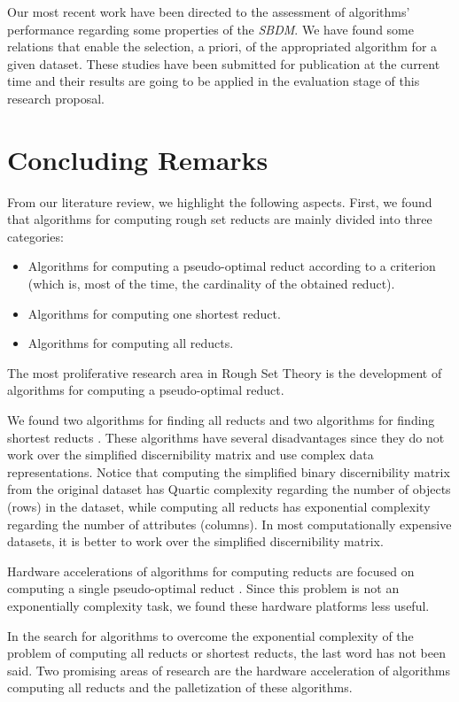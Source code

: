 \documentclass[citenumber]{elsarticle}
\begin{document}
	Our most recent work have been directed to the assessment of algorithms' performance regarding some properties of the \textit{SBDM}. We have found some relations that enable the selection, a priori, of the appropriated algorithm for a given dataset. These studies have been submitted for publication at the current time and their results are going to be applied in the evaluation stage of this research proposal. 
%
\section{Concluding Remarks}\label{conclusions}
%
   From our literature review, we highlight the following aspects. First, we found that algorithms for computing rough set reducts are mainly divided into three categories:
    \begin{itemize}
  	  \item Algorithms for computing a pseudo-optimal reduct according to a criterion (which is, most of the 
  	  		time, the cardinality of the obtained reduct).
  	  \item Algorithms for computing one shortest reduct.
  	  \item Algorithms for computing all reducts.
    \end{itemize}
    The most proliferative research area in Rough Set Theory is the development of algorithms for computing a 
    pseudo-optimal reduct. 
    
    We found two algorithms for finding all reducts \cite{Starzyk00,WangP07} and two algorithms for finding shortest reducts \cite{Lin04,Jensen14}. These algorithms have several disadvantages since they do not work over the simplified discernibility matrix and use complex data representations. Notice that computing the simplified binary discernibility matrix from the original dataset has Quartic complexity regarding the number of objects (rows) in the dataset, while computing all reducts has exponential complexity regarding the number of attributes (columns). In most computationally expensive datasets, it is better to work over the simplified discernibility matrix. 
    
    Hardware accelerations of algorithms for computing reducts are focused on computing a single pseudo-optimal reduct \cite{Tiwari11,Tiwari12,Tiwari13,Grzes13,Kopczynski14,Tiwari14}. Since this problem is not an exponentially complexity task, we found these hardware platforms less useful.	
		    
    In the search for algorithms to overcome the exponential complexity of the problem of computing all reducts or
    shortest reducts, the last word has not been said. Two promising areas of research are the hardware acceleration of algorithms computing all reducts and the palletization of these algorithms.
  
%


\end{document}
